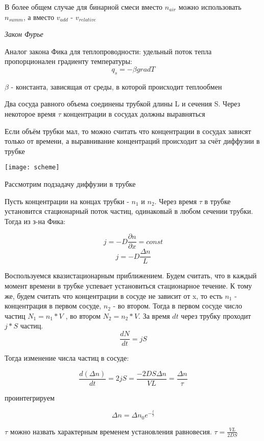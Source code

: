 \documentclass{article}
\begin{document}
 \vspace{20pt}

 В более общем случае для бинарной смеси вместо $n_{air}$ можно использовать $n_{summ}$, а вместо $v_{add}$  - $v_{relative}$
 
 \pagebreak

 \textit{Закон Фурье}

 Аналог закона Фика для теплопроводности: удельный поток тепла пропорционален градиенту температуры:
 \[ q_s = - \beta gradT\]

 $\beta$ - константа, зависящая от среды, в которой происходит теплообмен

 \vspace{30pt}
 
 Два сосуда равного объема соединены трубкой длины L и сечения S. Через некоторое время $\tau$ концентрации в сосудах должны выравняться

 Если объём трубки мал, то можно считать что концентрации в сосудах зависят только от времени, а выравнивание концентраций происходит за счёт диффузии в  трубке 

 \texttt{[image: scheme]} 

 Рассмотрим подзадачу диффузии в трубке

 Пусть концентрации на концах трубки - $n_1$ и $n_2$. Через время $\tau$ в трубке установится стационарный поток частиц, одинаковый в любом сечении трубки. Тогда из з-на Фика:
 
 \[ j = -D\frac{\partial{n}}{\partial{x}} = const\] 
 \[j = -D \frac{\Delta{n}}{L}\]

 Воспользуемся квазистационарным приближением. Будем считать, что в каждый момент времени в трубке успевает установиться стационарное течение. 
 К тому же, будем считать что концентрации в сосуде не зависит от x, то есть $n_1$ - концентрация в первом сосуде, $n_2$ - во втором. Тогда в первом сосуде число частиц $N_1 = n_1 * V$ , во втором $N_2 = n_2 * V$. За время $dt$ через трубку проходит $ j * S$ частиц. 
 \[\frac{dN}{dt} = jS\]

 Тогда изменение числа частиц в сосуде:

 \[\frac{d(\Delta{n})}{dt}  = 2jS = \frac{-2DS\Delta{n}}{VL} = \frac{\Delta{n}}{\tau}\]

 проинтегрируем

 \[\Delta{n} = \Delta{n_0}e^{-\frac{t}{\tau}}\]

 $\tau$ можно назвать характерным временем установления равновесия. $\tau = \frac{VL}{2DS}$
\end{document}
